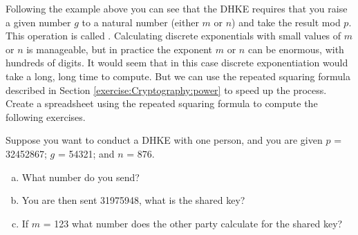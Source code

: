

Following the example above you can see that the DHKE requires that you raise a given number $g$ to a natural number (either $m$ or $n$) and take the result mod $p$. This operation is called . Calculating discrete exponentials with small values of $m$ or $n$ is manageable, but in practice the exponent $m$ or $n$ can be enormous, with hundreds of digits. It would seem that in this case discrete exponentiation would take a long, long time to compute.  But we can use the repeated squaring formula described in Section \ref{exercise:Cryptography:power} to speed up the process.  Create a spreadsheet using the repeated squaring formula to compute the following exercises.
 
\begin{exer}
Suppose you want to conduct a DHKE with one person, and you are given $p$ = 32452867; $g$ = 54321; and $n$ = 876.  
\begin{enumerate}[(a)]
\item What number do you send?  

\item You are then sent 31975948, what is the shared key? 

\item If $m$ = 123 what number does the other party calculate for the shared key?
\end{enumerate}
\end{exer}


